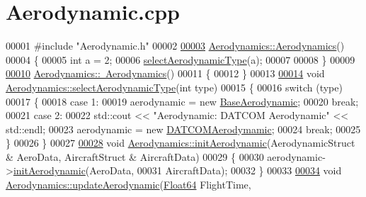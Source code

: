 \hypertarget{_aerodynamic_8cpp_source}{}\section{Aerodynamic.\+cpp}
\label{_aerodynamic_8cpp_source}

\begin{DoxyCode}
00001 \textcolor{preprocessor}{#include "Aerodynamic.h"}
00002 
\hyperlink{group___aerodynamic_a36c7ae850ce18605cdbf3ce1709d8e54}{00003} \hyperlink{group___aerodynamic_a36c7ae850ce18605cdbf3ce1709d8e54}{Aerodynamics::Aerodynamics}()
00004 \{
00005     \textcolor{keywordtype}{int} a = 2;
00006     \hyperlink{group___aerodynamic_a9aa3397e8b1d91ed237146a57bbe6bcf}{selectAerodynamicType}(a);
00007 
00008 \}
00009 
\hyperlink{group___aerodynamic_af0e048e0c80ec8334997b79b761fea60}{00010} \hyperlink{group___aerodynamic_af0e048e0c80ec8334997b79b761fea60}{Aerodynamics::~Aerodynamics}()
00011 \{
00012 \}
00013 
\hyperlink{group___aerodynamic_a9aa3397e8b1d91ed237146a57bbe6bcf}{00014} \textcolor{keywordtype}{void} \hyperlink{group___aerodynamic_a9aa3397e8b1d91ed237146a57bbe6bcf}{Aerodynamics::selectAerodynamicType}(\textcolor{keywordtype}{int} type)
00015 \{
00016     \textcolor{keywordflow}{switch} (type)
00017     \{
00018     \textcolor{keywordflow}{case} 1:
00019         aerodynamic = \textcolor{keyword}{new} \hyperlink{group___aerodynamic_class_base_aerodynamic}{BaseAerodynamic};
00020         \textcolor{keywordflow}{break};
00021     \textcolor{keywordflow}{case} 2:
00022         std::cout << \textcolor{stringliteral}{"Aerodynamic: DATCOM Aerodynamic"} << std::endl;
00023         aerodynamic = \textcolor{keyword}{new} \hyperlink{group___aerodynamic_class_d_a_t_c_o_m_aerodymamic}{DATCOMAerodymamic};
00024         \textcolor{keywordflow}{break};
00025     \}
00026 \}
00027 
\hyperlink{group___aerodynamic_aa4fee96e5b485cac47b3bc2127a6d4e2}{00028} \textcolor{keywordtype}{void} \hyperlink{group___aerodynamic_aa4fee96e5b485cac47b3bc2127a6d4e2}{Aerodynamics::initAerodynamic}(AerodynamicStruct & AeroData, 
      AircraftStruct & AircraftData)
00029 \{
00030     aerodynamic->\hyperlink{group___aerodynamic_a5ea58755a40507d217848efb151879c8}{initAerodynamic}(AeroData, 
00031                                  AircraftData);
00032 \}
00033 
\hyperlink{group___aerodynamic_adf6047b063022ff3b689e269d2b35863}{00034} \textcolor{keywordtype}{void} \hyperlink{group___aerodynamic_adf6047b063022ff3b689e269d2b35863}{Aerodynamics::updateAerodynamic}(\hyperlink{group___tools_ga3f1431cb9f76da10f59246d1d743dc2c}{Float64} FlightTime, 

\end{DoxyCode}

